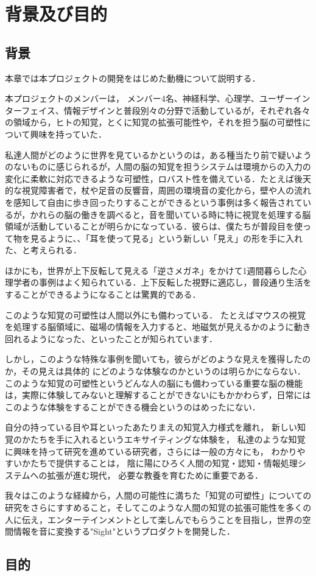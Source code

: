 \section{背景及び目的}
\subsection{背景}
本章では本プロジェクトの開発をはじめた動機について説明する．

本プロジェクトのメンバーは，
メンバー4名、神経科学、心理学、ユーザーインターフェイス、情報デザインと普段別々の分野で活動しているが，それぞれ各々の領域から，ヒトの知覚，とくに知覚の拡張可能性や，それを担う脳の可塑性について興味を持っていた．

私達人間がどのように世界を見ているかというのは，ある種当たり前で疑いようのないものに感じられるが，人間の脳の知覚を担うシステムは環境からの入力の変化に柔軟に対応できるような可塑性，ロバスト性を備えている．たとえば後天的な視覚障害者で，杖や足音の反響音，周囲の環境音の変化から，壁や人の流れを感知して自由に歩き回ったりすることができるという事例は多く報告されているが，かれらの脳の働きを調べると，音を聞いている時に特に視覚を処理する脳領域が活動していることが明らかになっている．彼らは、僕たちが普段目を使って物を見るように、、「耳を使って見る」という新しい「見え」の形を手に入れた、と考えられる．

ほかにも，世界が上下反転して見える「逆さメガネ」をかけて1週間暮らした心理学者の事例はよく知られている．上下反転した視野に適応し，普段通り生活をすることができるようになることは驚異的である．

このような知覚の可塑性は人間以外にも備わっている．
たとえばマウスの視覚を処理する脳領域に、磁場の情報を入力すると、地磁気が見えるかのように動き回れるようになった、といったことが知られています．

しかし，このような特殊な事例を聞いても，彼らがどのような見えを獲得したのか，その見えは具体的
にどのような体験なのかというのは明らかにならない．このような知覚の可塑性というどんな人の脳にも備わっている重要な脳の機能は，実際に体験してみないと理解することができないにもかかわらず，日常にはこのような体験をすることができる機会というのはめったにない．

自分の持っている目や耳といったあたりまえの知覚入力様式を離れ，
新しい知覚のかたちを手に入れるというエキサイティングな体験を，
私達のような知覚に興味を持って研究を進めている研究者，さらには一般の方々にも，
わかりやすいかたちで提供することは，
陰に陽にひろく人間の知覚・認知・情報処理システムへの拡張が進む現代，
必要な教養を育むために重要である．

我々はこのような経緯から，人間の可能性に満ちた「知覚の可塑性」についての研究をさらにすすめること，そしてこのような人間の知覚の拡張可能性を多くの人に伝え，エンターテインメントとして楽しんでもらうことを目指し，世界の空間情報を音に変換する"Sight"というプロダクトを開発した．

\subsection{目的}













